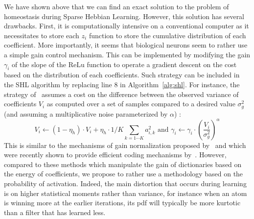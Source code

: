 \documentclass[draft]{article} %
\newcommand{\seeFig}[1]{Figure~\ref{fig:#1}}%
\begin{document}
We have shown above that we can find an exact solution to the problem of homeostasis during Sparse Hebbian Learning. However, this solution has several drawbacks. First, it is computationally intensive on a conventional computer as it necessitates to store each $z_i$ function to store the cumulative distribution of each coefficient. More importantly, it seems that biological neurons seem to rather use a simple gain control mechanism. This can be implemented by modifying the gain $\gamma_i$ of the slope of the ReLu function to operate a gradient descent on the cost based on the distribution of each coefficients. Such strategy can be included in the SHL algorithm by replacing line 8 in Algorithm~\ref{alg:shl}. For instance, the strategy of~\citep{Olshausen97} assumes a cost on the difference between the observed variance of coefficients $V_i$ as computed over a set of samples compared to a desired value $\sigma_g^2$ (and assuming a multiplicative noise parameterized by $\alpha$) :
\begin{equation}%
V_i \leftarrow (1- \eta_h ) \cdot V_i + \eta_h \cdot 1/K\sum_{k=1\cdots K} a_{i, k}^2 \textrm{ and }
\gamma_i \leftarrow \gamma_i \cdot \left( \frac{V_i}{\sigma_g^2} \right)^\alpha
\end{equation}%
This is similar to the mechanisms of gain normalization proposed by~\citet{Schwartz01} and which were recently shown to provide efficient coding mechanisms by~\citet{Simoncelli17}. However, compared to these methods which manipulate the gain of dictionaries based on the energy of coefficients, we propose to rather use a methodology based on the probability of activation. Indeed, the main distortion that occurs during learning is on higher statistical moments rather than variance, for instance when an atom is winning more at the earlier iterations, its pdf will typically be more kurtotic than a filter that has learned less.
\end{document}
